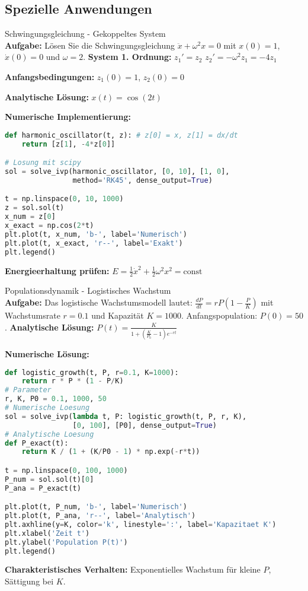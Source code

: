 \subsection{Spezielle Anwendungen}

\begin{example2}{Schwingungsgleichung - Gekoppeltes System}\\
\textbf{Aufgabe:} Lösen Sie die Schwingungsgleichung $\ddot{x} + \omega^2 x = 0$ mit $x(0) = 1$, $\dot{x}(0) = 0$ und $\omega = 2$.
\tcblower
\textbf{System 1. Ordnung:}
$z_1' = z_2$
$z_2' = -\omega^2 z_1 = -4z_1$

\textbf{Anfangsbedingungen:} $z_1(0) = 1$, $z_2(0) = 0$

\textbf{Analytische Lösung:} $x(t) = \cos(2t)$

\textbf{Numerische Implementierung:}
\begin{lstlisting}[language=Python, style=basesmol]
def harmonic_oscillator(t, z): # z[0] = x, z[1] = dx/dt
    return [z[1], -4*z[0]]

# Losung mit scipy
sol = solve_ivp(harmonic_oscillator, [0, 10], [1, 0], 
                method='RK45', dense_output=True)

t = np.linspace(0, 10, 1000)
z = sol.sol(t)
x_num = z[0]
x_exact = np.cos(2*t)
plt.plot(t, x_num, 'b-', label='Numerisch')
plt.plot(t, x_exact, 'r--', label='Exakt')
plt.legend()
\end{lstlisting}

\textbf{Energieerhaltung prüfen:} 
$E = \frac{1}{2}\dot{x}^2 + \frac{1}{2}\omega^2 x^2 = \text{const}$
\end{example2}

\begin{example2}{Populationsdynamik - Logistisches Wachstum}\\
\textbf{Aufgabe:} Das logistische Wachstumsmodell lautet:
$\frac{dP}{dt} = rP(1 - \frac{P}{K})$
mit Wachstumsrate $r = 0.1$ und Kapazität $K = 1000$. Anfangspopulation: $P(0) = 50$.
\tcblower
\textbf{Analytische Lösung:}
$P(t) = \frac{K}{1 + (\frac{K}{P_0} - 1)e^{-rt}}$

\textbf{Numerische Lösung:}
\begin{lstlisting}[language=Python, style=basesmol]
def logistic_growth(t, P, r=0.1, K=1000):
    return r * P * (1 - P/K)
# Parameter
r, K, P0 = 0.1, 1000, 50
# Numerische Loesung
sol = solve_ivp(lambda t, P: logistic_growth(t, P, r, K), 
                [0, 100], [P0], dense_output=True)
# Analytische Loesung
def P_exact(t):
    return K / (1 + (K/P0 - 1) * np.exp(-r*t))

t = np.linspace(0, 100, 1000)
P_num = sol.sol(t)[0]
P_ana = P_exact(t)

plt.plot(t, P_num, 'b-', label='Numerisch')
plt.plot(t, P_ana, 'r--', label='Analytisch')
plt.axhline(y=K, color='k', linestyle=':', label='Kapazitaet K')
plt.xlabel('Zeit t')
plt.ylabel('Population P(t)')
plt.legend()
\end{lstlisting}

\textbf{Charakteristisches Verhalten:} Exponentielles Wachstum für kleine $P$, Sättigung bei $K$.
\end{example2}

